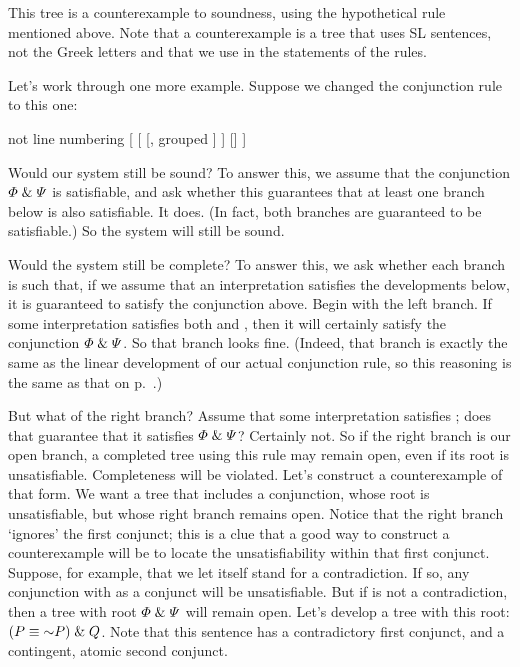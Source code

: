This tree is a counterexample to soundness, using the hypothetical rule mentioned above. Note that a counterexample is a tree that uses SL sentences, not the Greek letters \metaA{} and \metaB{} that we use in the statements of the rules.

Let's work through one more example. Suppose we changed the conjunction rule to this one:
	\begin{center}
	\begin{prooftree}
	{not line numbering}
	[\metaA{}\eand\metaB{}
		[\metaA{}
		[\metaB{}, grouped
		]
		]
		[\metaB{}]
	]
\end{prooftree}
\end{center}
Would our system still be sound? To answer this, we assume that the conjunction $\varPhi{}\mathrel\&\varPsi{}$ is satisfiable, and ask whether this guarantees that at least one branch below is also satisfiable. It does. (In fact, both branches are guaranteed to be satisfiable.) So the system will still be sound.

Would the system still be complete? To answer this, we ask whether each branch is such that, if we assume that an interpretation satisfies the developments below, it is guaranteed to satisfy the conjunction above. Begin with the left branch. If some interpretation satisfies both \metaA{} and \metaB{}, then it will certainly satisfy the conjunction $\varPhi{}\mathrel\&\varPsi{}$. So that branch looks fine. (Indeed, that branch is exactly the same as the linear development of our actual conjunction rule, so this reasoning is the same as that on p.\ \pageref{conjunctionsound}.)

But what of the right branch? Assume that some interpretation satisfies \metaB{}; does that guarantee that it satisfies $\varPhi{}\mathrel\&\varPsi{}$? Certainly not. So if the right branch is our open branch, a completed tree using this rule may remain open, even if its root is unsatisfiable. Completeness will be violated. Let's construct a counterexample of that form. We want a tree that includes a conjunction, whose root is unsatisfiable, but whose right branch remains open. Notice that the right branch `ignores' the first conjunct; this is a clue that a good way to construct a counterexample will be to locate the unsatisfiability within that first conjunct. Suppose, for example, that we let \metaA{} itself stand for a contradiction. If so, any conjunction with \metaA{} as a conjunct will be unsatisfiable. But if \metaB{} is not a contradiction, then a tree with root $\varPhi{}\mathrel\&\varPsi{}$ will remain open. Let's develop a tree with this root: $(P \eiff \enot P) \eand Q$. Note that this sentence has a contradictory first conjunct, and a contingent, atomic second conjunct.


